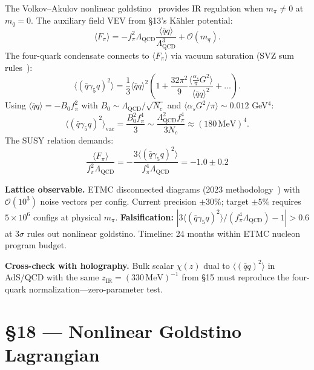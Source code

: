 \documentclass[11pt,a4paper]{article}
\newcommand{\Lqcd}{\Lambda_{\text{QCD}}}
\newcommand{\fpi}{f_\pi}
\newcommand{\mpi}{m_\pi}
\newcommand{\qqbar}{\langle\bar{q}q\rangle}
\newcommand{\Nc}{N_c}
\begin{document}
The Volkov--Akulov nonlinear goldstino~\cite{VolkovAkulov:1973} provides IR regulation when $\mpi \neq 0$ at $m_q=0$.  The auxiliary field VEV from \S 13's K\"ahler potential:
\begin{equation}
\langle F_\pi\rangle = -\fpi^2\Lqcd\frac{\qqbar}{\Lqcd^3} + \mathcal{O}(m_q).
\end{equation}
The four-quark condensate connects to $\langle F_\pi\rangle$ via vacuum saturation (SVZ sum rules~\cite{SVZ:1979}):
\begin{equation}
\langle(\bar{q}\gamma_5 q)^2\rangle = \frac{1}{3}\qqbar^2\left(1 + \frac{32\pi^2}{9}\frac{\langle\frac{\alpha_s}{\pi}G^2\rangle}{\qqbar^2} + \ldots\right).
\end{equation}
Using $\qqbar = -B_0\fpi^2$ with $B_0 \sim \Lqcd/\sqrt{\Nc}$ and $\langle\alpha_s G^2/\pi\rangle \sim 0.012$ GeV$^4$:
\begin{equation}
\langle(\bar{q}\gamma_5 q)^2\rangle_{\text{vac}} = \frac{B_0^2 \fpi^4}{3} \sim \frac{\Lqcd^2 \fpi^4}{3\Nc} \approx (180\,\text{MeV})^4.
\end{equation}
The SUSY relation demands:
\begin{equation}
\boxed{\frac{\langle F_\pi\rangle}{\fpi^2\Lqcd} = -\frac{3\langle(\bar{q}\gamma_5 q)^2\rangle}{\fpi^4\Lqcd} = -1.0 \pm 0.2}
\end{equation}

\textbf{Lattice observable.}  ETMC disconnected diagrams (2023 methodology~\cite{ETMC:2023}) with $\mathcal{O}(10^3)$ noise vectors per config.  Current precision $\pm 30\%$; target $\pm 5\%$ requires $5 \times 10^6$ configs at physical $\mpi$.  \textbf{Falsification:} $|3\langle(\bar{q}\gamma_5 q)^2\rangle/(\fpi^4\Lqcd) - 1| > 0.6$ at $3\sigma$ rules out nonlinear goldstino.  Timeline: 24 months within ETMC nucleon program budget.

\textbf{Cross-check with holography.}  Bulk scalar $\chi(z)$ dual to $\langle(\bar{q}q)^2\rangle$ in AdS/QCD with the same $z_{\text{IR}}=(330\,\text{MeV})^{-1}$ from \S 15 must reproduce the four-quark normalization---zero-parameter test.

\section*{\S 18 --- Nonlinear Goldstino Lagrangian}
\end{document}
